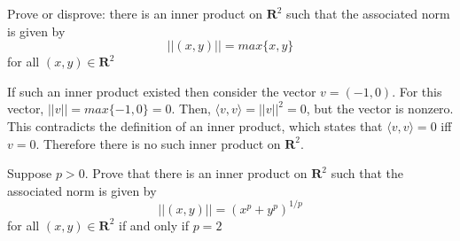 \begin{exercise}{17}
Prove or disprove: there is an inner product on $\mathbf{R}^2$ such that the associated norm is given by 
$$ \lvert \lvert (x, y) \rvert \rvert = max\{x, y\}$$
for all $(x, y) \in \mathbf{R}^2$
\end{exercise}

\begin{solution}

If such an inner product existed then consider the vector $v = (-1, 0)$. For this vector, $\lvert \lvert v \rvert \rvert = max\{-1, 0\} = 0$. Then, $\langle v, v \rangle = \lvert \lvert v \rvert \rvert ^2 = 0$, but the vector is nonzero. This contradicts the definition of an inner product, which states that $\langle v, v \rangle = 0$ iff $v = 0$. Therefore there is no such inner product on $\mathbf{R}^2$.
\end{solution}

\begin{exercise}{18}
Suppose $p > 0$. Prove that there is an inner product on $\mathbf{R}^2$ such that the associated norm is given
by $$ \lvert \lvert (x, y) \rvert \rvert = (x^p + y^p)^{1/p} $$ for all $(x, y) \in \mathbf{R}^2$ if and only if $p=2$
\end{exercise}

